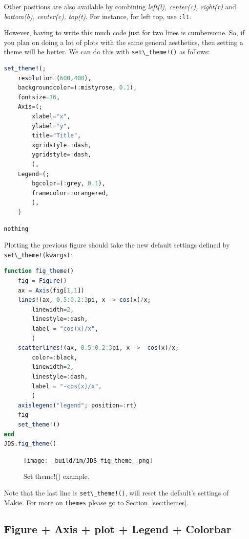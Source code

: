 \documentclass[
  notoc %
]{tufte-book}
\newcommand{\passthrough}[1]{#1}
\begin{document}
Other positions are also available by combining \emph{left(l),
center(c), right(r)} and \emph{bottom(b), center(c), top(t)}. For
instance, for left top, use \passthrough{\lstinline!:lt!}.

However, having to write this much code just for two lines is
cumbersome. So, if you plan on doing a lot of plots with the same
general aesthetics, then setting a theme will be better. We can do this
with \passthrough{\lstinline"set\_theme!()"} as follows:

\begin{lstlisting}[language=Julia]
set_theme!(;
    resolution=(600,400),
    backgroundcolor=(:mistyrose, 0.1),
    fontsize=16,
    Axis=(;
        xlabel="x",
        ylabel="y",
        title="Title",
        xgridstyle=:dash,
        ygridstyle=:dash,
        ),
    Legend=(;
        bgcolor=(:grey, 0.1),
        framecolor=:orangered,
        ),
    )
\end{lstlisting}

\begin{lstlisting}[language=Output]
nothing
\end{lstlisting}

Plotting the previous figure should take the new default settings
defined by \passthrough{\lstinline"set\_theme!(kwargs)"}:

\begin{lstlisting}[language=Julia]
function fig_theme()
    fig = Figure()
    ax = Axis(fig[1,1])
    lines!(ax, 0.5:0.2:3pi, x -> cos(x)/x;
        linewidth=2,
        linestyle=:dash,
        label = "cos(x)/x",
        )
    scatterlines!(ax, 0.5:0.2:3pi, x -> -cos(x)/x;
        color=:black,
        linewidth=2,
        linestyle=:dash,
        label = "-cos(x)/x",
        )
    axislegend("legend"; position=:rt)
    fig
    set_theme!()
end
JDS.fig_theme()
\end{lstlisting}

\begin{figure}
\hypertarget{fig:setTheme}{%
\centering
\texttt{[image: \_build/im/JDS\_fig\_theme\_.png]}
\caption{Set theme!() example.}\label{fig:setTheme}
}
\end{figure}

Note that the last line is \passthrough{\lstinline"set\_theme!()"}, will
reset the default's settings of Makie. For more on
\passthrough{\lstinline!themes!} please go to Section~\ref{sec:themes}.

\hypertarget{figure-axis-plot-legend-colorbar}{%
\subsection{Figure + Axis + plot + Legend +
Colorbar}\label{figure-axis-plot-legend-colorbar}}
\end{document}
